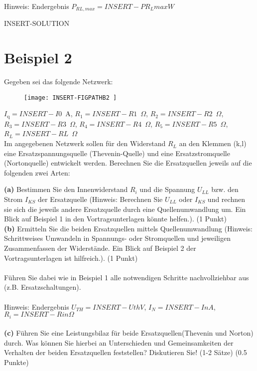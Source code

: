 Hinweis: Endergebnis $P_{RL,max} = INSERT-PR_Lmax W$

INSERT-SOLUTION


\newpage
\section*{Beispiel 2}
Gegeben sei das folgende Netzwerk:\\
\FloatBarrier
	\begin{figure}[h]
        \centering
        \def\svgwidth{300pt}
		\texttt{[image:  INSERT-FIGPATHB2 ]}
    \end{figure}
\FloatBarrier

$I_{\mathrm{q}} = INSERT-I0 $~A, $R_1 = INSERT-R1 $~$\Omega$, $R_2 = INSERT-R2 $~$\Omega$, $R_3 = INSERT-R3 $~$\Omega$, $R_4 = INSERT-R4 $~$\Omega$, $R_5 = INSERT-R5 $~$\Omega$, $R_L = INSERT-RL $~$\Omega$\\
		
Im angegebenen Netzwerk sollen f\"ur den Widerstand $R_L$ an den Klemmen (k,l) eine Ersatzspannungsquelle (Thevenin-Quelle) und eine Ersatzstromquelle (Nortonquelle) entwickelt werden. 
Berechnen Sie die Ersatzquellen jeweils auf die folgenden zwei Arten:

\textbf{(a)} Bestimmen Sie den Innenwiderstand $ R_i$ und die Spannung $U_{LL}$ bzw. den Strom $I_{KS}$ der Ersatzquelle (Hinweis: Berechnen Sie $U_{LL}$ oder $I_{KS}$ und rechnen sie sich die jeweils andere Ersatzquelle durch eine Quellenumwandlung um. Ein Blick auf Beispiel 1 in den Vortragsunterlagen k\"onnte helfen.).
(1 Punkt)\\
\textbf{(b)} Ermitteln Sie die beiden Ersatzquellen mittels Quellenumwandlung (Hinweis: Schrittweises Umwandeln
in Spannungs- oder Stromquellen und jeweiligen Zusammenfassen der Widerst\"ande. Ein Blick auf Beispiel 2 der Vortragsunterlagen ist hilfreich.). (1 Punkt)\\
\\
F\"uhren Sie dabei wie in Beispiel 1 alle notwendigen Schritte nachvollziehbar aus (z.B. Ersatzschaltungen).\\
\\ 
Hinweis: Endergebnis $U_{TH} = INSERT-Uth V$, $I_{N} = INSERT-In A$, $R_{i} = INSERT-Rin \Omega$ \\
\\
\textbf{(c)} F\"uhren Sie eine Leistungsbilaz f\"ur beide Ersatzquellen(Thevenin und Norton) durch. Was k\"onnen Sie hierbei an Unterschieden und Gemeinsamkeiten der Verhalten der beiden Ersatzquellen feststellen? Diskutieren Sie! (1-2 S\"atze) (0.5 Punkte)\\

